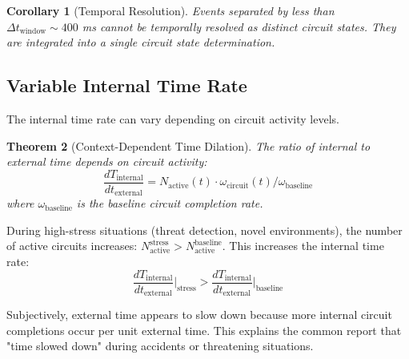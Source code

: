 \documentclass[aps,prd,twocolumn,superscriptaddress,floatfix,nofootinbib]{revtex4-2}
\newtheorem{theorem}{Theorem}[section]
\newtheorem{corollary}[theorem]{Corollary}
\theoremstyle{remark}
\begin{document}
\begin{corollary}[Temporal Resolution]
\label{cor:temporal_resolution}
Events separated by less than $\Delta t_{\text{window}} \sim 400$ ms cannot be temporally resolved as distinct circuit states. They are integrated into a single circuit state determination.
\end{corollary}

\subsection{Variable Internal Time Rate}

The internal time rate can vary depending on circuit activity levels.

\begin{theorem}[Context-Dependent Time Dilation]
\label{thm:time_dilation}
The ratio of internal to external time depends on circuit activity:
\begin{equation}
\frac{dT_{\text{internal}}}{dt_{\text{external}}} = N_{\text{active}}(t) \cdot \omega_{\text{circuit}}(t) / \omega_{\text{baseline}}
\end{equation}
where $\omega_{\text{baseline}}$ is the baseline circuit completion rate.
\end{theorem}

\begin{example}
During high-stress situations (threat detection, novel environments), the number of active circuits increases: $N_{\text{active}}^{\text{stress}} > N_{\text{active}}^{\text{baseline}}$. This increases the internal time rate:
$$
\frac{dT_{\text{internal}}}{dt_{\text{external}}} \bigg|_{\text{stress}} > \frac{dT_{\text{internal}}}{dt_{\text{external}}} \bigg|_{\text{baseline}}
$$

Subjectively, external time appears to slow down because more internal circuit completions occur per unit external time. This explains the common report that "time slowed down" during accidents or threatening situations.
\end{example}
\end{document}
